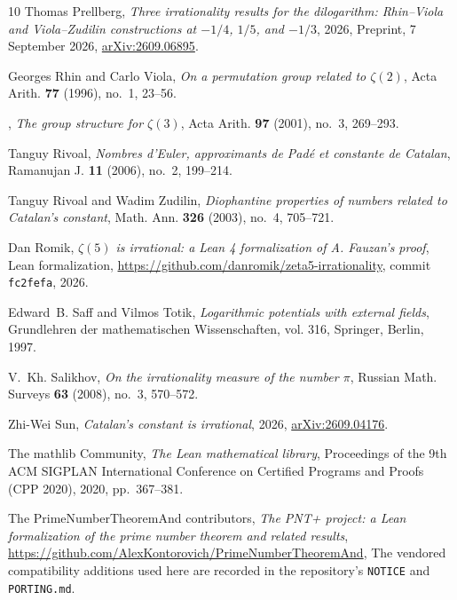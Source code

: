 \documentclass[11pt]{amsart}
\theoremstyle{definition}
\theoremstyle{remark}
\numberwithin{equation}{section}
\begin{document}
\begin{thebibliography}{10}
Thomas Prellberg, \emph{Three irrationality results for the dilogarithm:
  {R}hin--{V}iola and {V}iola--{Z}udilin constructions at {$-1/4$}, {$1/5$},
  and {$-1/3$}}, 2026, Preprint, 7 September 2026,
  \href{https://arxiv.org/abs/2609.06895}{arXiv:2609.06895}.

Georges Rhin and Carlo Viola, \emph{On a permutation group related to
  {$\zeta(2)$}}, Acta Arith. \textbf{77} (1996), no.~1, 23--56.

\bysame, \emph{The group structure for {$\zeta(3)$}}, Acta Arith. \textbf{97}
  (2001), no.~3, 269--293.

Tanguy Rivoal, \emph{Nombres d'{E}uler, approximants de {P}ad\'e et constante
  de {C}atalan}, Ramanujan J. \textbf{11} (2006), no.~2, 199--214.

Tanguy Rivoal and Wadim Zudilin, \emph{Diophantine properties of numbers
  related to {C}atalan's constant}, Math. Ann. \textbf{326} (2003), no.~4,
  705--721.

Dan Romik, \emph{{$\zeta(5)$} is irrational: a {L}ean 4 formalization of {A}.
  {F}auzan's proof}, Lean formalization,
  \url{https://github.com/danromik/zeta5-irrationality}, commit
  \texttt{fc2fefa}, 2026.

Edward~B. Saff and Vilmos Totik, \emph{Logarithmic potentials with external
  fields}, Grundlehren der mathematischen Wissenschaften, vol. 316, Springer,
  Berlin, 1997.

V.~Kh. Salikhov, \emph{On the irrationality measure of the number {$\pi$}},
  Russian Math. Surveys \textbf{63} (2008), no.~3, 570--572.

Zhi-Wei Sun, \emph{Catalan's constant is irrational}, 2026,
  \href{https://arxiv.org/abs/2609.04176}{arXiv:2609.04176}.

{The mathlib Community}, \emph{The {L}ean mathematical library}, Proceedings of
  the 9th ACM SIGPLAN International Conference on Certified Programs and Proofs
  (CPP 2020), 2020, pp.~367--381.

{The PrimeNumberTheoremAnd contributors}, \emph{The {PNT+} project: a {L}ean
  formalization of the prime number theorem and related results},
  \url{https://github.com/AlexKontorovich/PrimeNumberTheoremAnd}, The vendored
  compatibility additions used here are recorded in the repository's
  \texttt{NOTICE} and \texttt{PORTING.md}.


\end{thebibliography}
\end{document}
